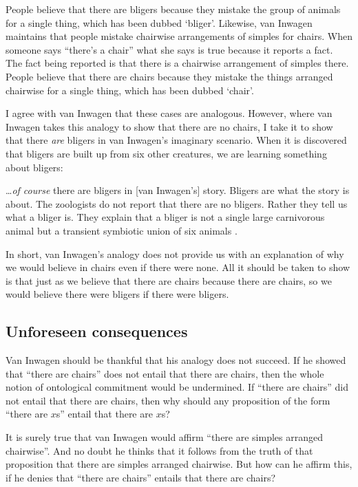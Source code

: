 \documentclass[11pt]{article}
\newenvironment{squote}{%
\begin{spacing}{1}
\begin{list}{}{%
    \setlength{\labelwidth}{0pt}%
    \rightmargin\leftmargin%
  }
\item\relax
}{%
\end{list}%
\end{spacing}
}
\begin{document}
\begin{spacing}{1.5}
People believe that there are bligers because they mistake the group
of animals for a single thing, which has been dubbed `bliger'.
Likewise, van Inwagen maintains that people mistake chairwise
arrangements of simples for chairs.  When someone says ``there's a
chair'' what she says is true because it reports a fact.  The fact
being reported is that there is a chairwise arrangement of simples
there.  People believe that there are chairs because they mistake the
things arranged chairwise for a single thing, which has been dubbed
`chair'.

I agree with van Inwagen that these cases are analogous.  However,
where van Inwagen takes this analogy to show that there are no chairs,
I take it to show that there {\em are} bligers in van Inwagen's
imaginary scenario.  When it is discovered that bligers are built up
from six other creatures, we are learning something about bligers:

\begin{squote}
\ldots {\em of course} there are bligers in [van Inwagen's] story.
Bligers are what the story is about.  The zoologists do not report
that there are no bligers.  Rather they tell us what a bliger is.
They explain that a bliger is not a single large carnivorous animal
but a transient symbiotic union of six animals
\citep[704]{rosenberg1993}.
\end{squote}

In short, van Inwagen's analogy does not provide us with an
explanation of why we would believe in chairs even if there were
none.  All it should be taken to show is that just as we believe that
there are chairs because there are chairs, so we would believe there
were bligers if there were bligers.

\subsection{Unforeseen consequences}
\label{backfire}
Van Inwagen should be thankful that his analogy does not succeed.  If
he showed that ``there are chairs'' does not entail that there are
chairs, then the whole notion of ontological commitment would be
undermined.  If ``there are chairs'' did not entail that there are
chairs, then why should any proposition of the form ``there are $x$s''
entail that there are $x$s?

It is surely true that van Inwagen would affirm ``there are simples
arranged chairwise''.  And no doubt he thinks that it follows from the
truth of that proposition that there are simples arranged chairwise.
But how can he affirm this, if he denies that ``there are chairs''
entails that there are chairs?


\end{spacing}
\end{document}
